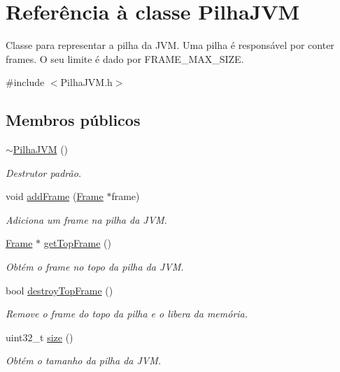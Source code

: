 \hypertarget{classPilhaJVM}{}\section{Referência à classe Pilha\+J\+VM}
\label{classPilhaJVM}


Classe para representar a pilha da J\+VM. Uma pilha é responsável por conter frames. O seu limite é dado por {\ttfamily F\+R\+A\+M\+E\+\_\+\+M\+A\+X\+\_\+\+S\+I\+ZE}.  




{\ttfamily \#include $<$Pilha\+J\+V\+M.\+h$>$}

\subsection*{Membros públicos}
\begin{DoxyCompactItemize}
\item 
\hyperlink{classPilhaJVM_a7995ffc4e2ca9b149b83293cbbe0ea1b}{$\sim$\+Pilha\+J\+VM} ()
\begin{DoxyCompactList}\small\item\em Destrutor padrão. \end{DoxyCompactList}\item 
void \hyperlink{classPilhaJVM_a64d7185bc812d3c81e5270c54c212e07}{add\+Frame} (\hyperlink{classFrame}{Frame} $\ast$frame)
\begin{DoxyCompactList}\small\item\em Adiciona um frame na pilha da J\+VM. \end{DoxyCompactList}\item 
\hyperlink{classFrame}{Frame} $\ast$ \hyperlink{classPilhaJVM_aa0e43da476df6147c86c8cc3d6899718}{get\+Top\+Frame} ()
\begin{DoxyCompactList}\small\item\em Obtém o frame no topo da pilha da J\+VM. \end{DoxyCompactList}\item 
bool \hyperlink{classPilhaJVM_a8ae0ed77b894fa95e73ea4077ebdeea2}{destroy\+Top\+Frame} ()
\begin{DoxyCompactList}\small\item\em Remove o frame do topo da pilha e o libera da memória. \end{DoxyCompactList}\item 
uint32\+\_\+t \hyperlink{classPilhaJVM_a22d7bcd7db598b00ae219c9c2efb2c88}{size} ()
\begin{DoxyCompactList}\small\item\em Obtém o tamanho da pilha da J\+VM. \end{DoxyCompactList}\end{DoxyCompactItemize}
